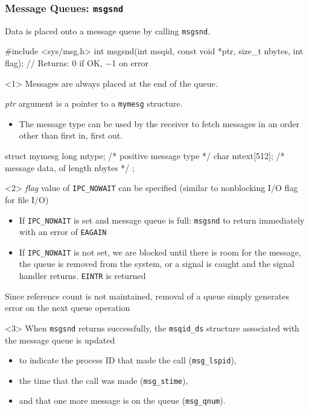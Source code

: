 \documentclass[newPxFont,sthlmFooter,nooffset]{beamer}
\begin{document}
\begin{frame}[t, fragile]
  \frametitle{Message Queues: \texttt{msgsnd}}
Data is placed onto a message queue by calling \texttt{msgsnd}.
\begin{codedef}
#include <sys/msg.h>
int msgsnd(int msqid, const void *ptr, size_t nbytes, int flag);
// Returns: 0 if OK, −1 on error
\end{codedef}


\begin{uncoverenv}<1>
Messages are always placed at the end of the queue.

\textit{ptr} argument is a pointer to a \texttt{mymesg} structure.
\begin{itemize}
\item The message type can be used by the receiver to fetch messages
  in an order other than first in, first out.
\end{itemize}

\begin{codedefnb}
struct mymesg {
    long mtype;      /* positive message type */
    char mtext[512]; /* message data, of length nbytes */
};
\end{codedefnb}
\end{uncoverenv}

\begin{uncoverenv}<2>
\vspace{-4.2cm}
\textit{flag} value of \texttt{IPC\_NOWAIT} can be specified (similar to nonblocking I/O flag for file I/O)
\begin{itemize}
\item If \texttt{IPC\_NOWAIT} is set and message queue is full: \texttt{msgsnd} to return immediately with an error of \texttt{EAGAIN}
\item If \texttt{IPC\_NOWAIT} is not set, we are blocked until there is room for the message, the queue is removed from the system, or a signal is caught and the signal handler returns. \texttt{EINTR} is returned
\end{itemize}
Since reference count is not maintained, removal of a queue simply generates error on the next queue operation
\end{uncoverenv}

\begin{uncoverenv}<3>
\vspace{-4.7cm}
When \texttt{msgsnd} returns successfully, the \texttt{msqid\_ds} structure associated with the message queue is updated
\begin{itemize}
\item  to indicate the process ID that made the call (\texttt{msg\_lspid}),
\item the time that the call was made (\texttt{msg\_stime}),
\item and that one more message is on the queue (\texttt{msg\_qnum}).
\end{itemize}
\end{uncoverenv}

\end{frame}
\end{document}
